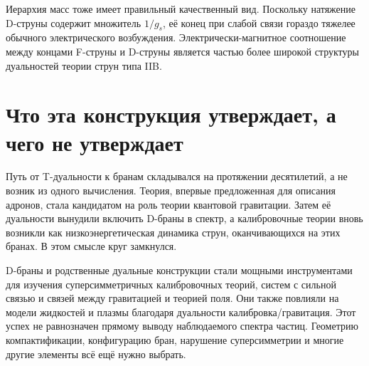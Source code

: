 Иерархия масс тоже имеет правильный качественный вид. Поскольку натяжение D-струны содержит множитель \(1/g_s\), её конец при слабой связи гораздо тяжелее обычного электрического возбуждения. Электрически-магнитное соотношение между концами F-струны и D-струны является частью более широкой структуры дуальностей теории струн типа IIB.

\begin{classroomqa}
\end{classroomqa}

\section{Что эта конструкция утверждает, а чего не утверждает}

Путь от T-дуальности к бранам складывался на протяжении десятилетий, а не возник из одного вычисления. Теория, впервые предложенная для описания адронов, стала кандидатом на роль теории квантовой гравитации. Затем её дуальности вынудили включить D-браны в спектр, а калибровочные теории вновь возникли как низкоэнергетическая динамика струн, оканчивающихся на этих бранах. В этом смысле круг замкнулся.

D-браны и родственные дуальные конструкции стали мощными инструментами для изучения суперсимметричных калибровочных теорий, систем с сильной связью и связей между гравитацией и теорией поля. Они также повлияли на модели жидкостей и плазмы благодаря дуальности калибровка/гравитация. Этот успех не равнозначен прямому выводу наблюдаемого спектра частиц. Геометрию компактификации, конфигурацию бран, нарушение суперсимметрии и многие другие элементы всё ещё нужно выбрать.

\begin{classroomqa}
\end{classroomqa}

